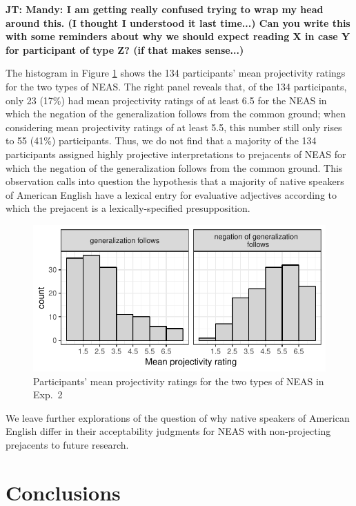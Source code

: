 \documentclass[11pt,fleqn]{article}
\newcommand{\6}{\mbox{$[\hspace*{-.6mm}[$}}
\newcommand{\9}{\mbox{$]\hspace*{-.6mm}]$}}
\newcommand{\jt}[1]{\textbf{\color{blue}JT: #1}}
\begin{document}
\jt{Mandy: I am getting really confused trying to wrap my head around this. (I thought I understood it last time...) Can you write this with some reminders about why we should expect reading X in case Y for participant of type Z? (if that makes sense...)}

The histogram in Figure \ref{f-dialect} shows the 134 participants' mean projectivity ratings for the two types of NEAS. The right panel reveals that, of the 134 participants, only 23 (17\%) had mean projectivity ratings of at least 6.5 for the NEAS in which the negation of the generalization follows from the common ground; when considering mean projectivity ratings of at least 5.5, this number still only rises to 55 (41\%) participants. Thus, we do not find that a majority of the 134 participants assigned highly projective interpretations to prejacents of NEAS for which the negation of the generalization follows from the common ground. This observation calls into question the hypothesis that a majority of native speakers of American English have a lexical entry for evaluative adjectives according to which the prejacent is a lexically-specified presupposition. 


\begin{figure}[h!]
\begin{center}
\includegraphics[scale=.9]{../exp2-projection/graphs/count-of-participants}

\caption{Participants' mean projectivity ratings for the two types of NEAS in Exp.~2}\label{f-dialect}
\end{center}
\end{figure}

We leave further explorations of the question of why native speakers of American English differ in their acceptability judgments for NEAS with non-projecting prejacents to future research.

\section{Conclusions}\label{s6}
\end{document}
